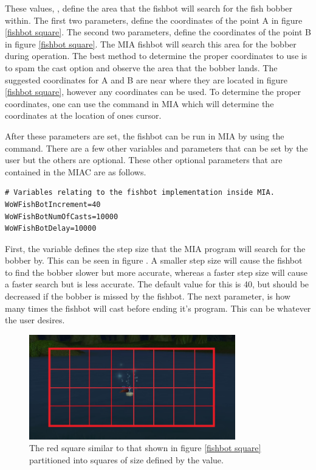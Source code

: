 These values, , define the area that the fishbot will search for the fish bobber within. The first two parameters,  define the coordinates of the point A in figure \ref{fishbot square}. The second two parameters,  define the coordinates of the point B in figure \ref{fishbot square}. The MIA fishbot will search this area for the bobber during operation. The best method to determine the proper coordinates to use is to spam the cast option and observe the area that the bobber lands. The suggested coordinates for A and B are near where they are located in figure \ref{fishbot square}, however any coordinates can be used. To determine the proper coordinates, one can use the  command in MIA which will determine the coordinates at the location of ones cursor.

After these parameters are set, the fishbot can be run in MIA by using the  command. There are a few other variables and parameters that can be set by the user but the others are optional. These other optional parameters that are contained in the MIAC are as follows.

\begin{lstlisting}
# Variables relating to the fishbot implementation inside MIA.
WoWFishBotIncrement=40
WoWFishBotNumOfCasts=10000
WoWFishBotDelay=10000
\end{lstlisting}

First, the  variable defines the step size that the MIA program will search for the bobber by. This can be seen in figure \label{fishbot increments}. A smaller step size will cause the fishbot to find the bobber slower but more accurate, whereas a faster step size will cause a faster search but is less accurate. The default value for this is 40, but should be decreased if the bobber is missed by the fishbot. The next parameter,  is how many times the fishbot will cast before ending it's program. This can be whatever the user desires. 



\begin{figure}[h]
	\centering
	\includegraphics[width=0.8\textwidth]{Images/WoWScrnShot_040118_234227b.jpg}
	\caption{The red square similar to that shown in figure \ref{fishbot square} partitioned into squares of size defined by the  value.} \label{fishbot increments}
\end{figure}

